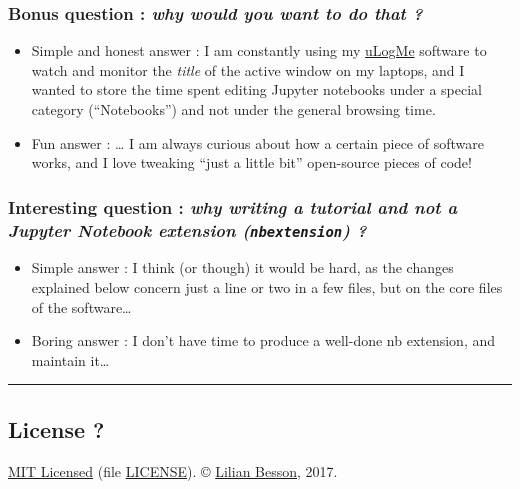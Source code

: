 \documentclass[]{article}
\providecommand{\tightlist}{%
  \setlength{\itemsep}{0pt}\setlength{\parskip}{0pt}}
\begin{document}
\subsubsection{\texorpdfstring{Bonus question : \emph{why would you want
to do \textbf{that}
?}}{Bonus question : why would you want to do that ?}}\label{bonus-question-why-would-you-want-to-do-that}

\begin{itemize}
\tightlist
\item
  Simple and honest answer : I am constantly using my
  \href{https://github.com/Naereen/uLogMe/}{uLogMe} software to watch
  and monitor the \emph{title} of the active window on my laptops, and I
  wanted to store the time spent editing Jupyter notebooks under a
  special category (``Notebooks'') and not under the general browsing
  time.
\item
  Fun answer : \ldots{} I am always curious about how a certain piece of
  software works, and I love tweaking ``just a little bit'' open-source
  pieces of code!
\end{itemize}

\subsubsection{\texorpdfstring{Interesting question : \emph{why writing
a tutorial and not a Jupyter Notebook extension (\texttt{nbextension})
?}}{Interesting question : why writing a tutorial and not a Jupyter Notebook extension (nbextension) ?}}\label{interesting-question-why-writing-a-tutorial-and-not-a-jupyter-notebook-extension-nbextension}

\begin{itemize}
\tightlist
\item
  Simple answer : I think (or though) it would be hard, as the changes
  explained below concern just a line or two in a few files, but on the
  core files of the software\ldots{}
\item
  Boring answer : I don't have time to produce a well-done nb extension,
  and maintain it\ldots{}
\end{itemize}

\begin{center}\rule{0.5\linewidth}{\linethickness}\end{center}

\subsection{License ?}\label{scroll-license}

\href{https://lbesson.mit-license.org/}{MIT Licensed} (file
\url{LICENSE}). © \href{https://GitHub.com/Naereen}{Lilian Besson},
2017.
\end{document}
